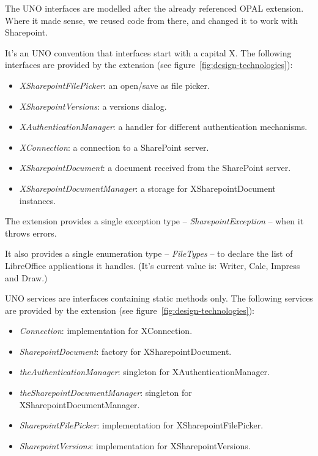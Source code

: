 The UNO interfaces are modelled after the already referenced OPAL extension.
Where it made sense, we reused code from there, and changed it to work with
Sharepoint.

It's an UNO convention that interfaces start with a capital X. The following
interfaces are provided by the extension (see figure~\ref{fig:design-technologies}):

\begin{itemize}
\item \emph{XSharepointFilePicker}: an open/save as file picker.
\item \emph{XSharepointVersions}: a versions dialog.
\item \emph{XAuthenticationManager}: a handler for different authentication mechanisms.
\item \emph{XConnection}: a connection to a SharePoint server.
\item \emph{XSharepointDocument}: a document received from the
SharePoint server.
\item \emph{XSharepointDocumentManager}: a storage for XSharepointDocument instances.
\end{itemize}

The extension provides a single exception type -- \emph{SharepointException} --
when it throws errors.

It also provides a single enumeration type -- \emph{FileTypes} -- to declare
the list of LibreOffice applications it handles. (It's current value is:
Writer, Calc, Impress and Draw.)

UNO services are interfaces containing static methods only.  The following
services are provided by the extension (see figure~\ref{fig:design-technologies}):

\begin{itemize}
\item \emph{Connection}: implementation for XConnection.
\item \emph{SharepointDocument}: factory for XSharepointDocument.
\item \emph{theAuthenticationManager}: singleton for XAuthenticationManager.
\item \emph{theSharepointDocumentManager}: singleton for XSharepointDocumentManager.
\item \emph{SharepointFilePicker}: implementation for XSharepointFilePicker.
\item \emph{SharepointVersions}: implementation for XSharepointVersions.
\end{itemize}

